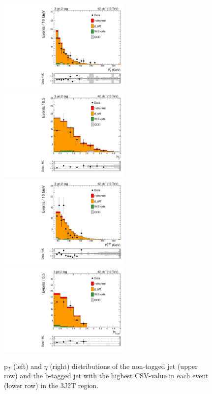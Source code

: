 \begin{figure}[hbpt]
\begin{center}
\includegraphics[width=6.5cm]{figures/3J2T/3j2t_ptjp.pdf}
\includegraphics[width=6.5cm]{figures/3J2T/3j2t_etajp.pdf}
\includegraphics[width=6.5cm]{figures/3J2T/3j2t_bpt.pdf}
\includegraphics[width=6.5cm]{figures/3J2T/3j2t_beta.pdf}\hfill
\caption{\label{fig:Jets3J2T}p$_{T}$ (left) and $\eta$ (right) distributions of the non-tagged jet (upper row) and the b-tagged jet with the highest CSV-value in each event (lower row) in the 3J2T region.}
\end{center}
\end{figure}
